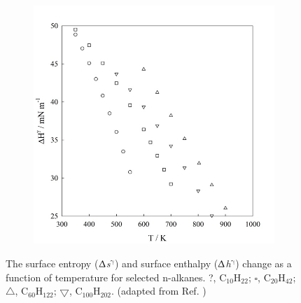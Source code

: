 \documentclass{scrbook}
\begin{document}
\begin{figure}
\begin{subfigure}{0.4\textwidth}
    \includegraphics[width=1\textwidth]{gfx/image69.jpeg}
	\end{subfigure}
\caption{The surface entropy (${\Updelta}$\textit{s}$^{\mathrm{{\gamma}}}$)
and surface enthalpy (${\Updelta}$\textit{h}$^{\mathrm{{\gamma}}}$) change as
a function of temperature for selected n-alkanes. ?, C$_{10}$H$_{22}$;
${\square}$, C$_{20}$H$_{42}$; ${\bigtriangleup}$, C$_{60}$H$_{122}$;
${\bigtriangledown}$, C$_{100}$H$_{202}$. (adapted from Ref. \citep{muller2011})}
\label{fig:22}
\end{figure}
\end{document}
